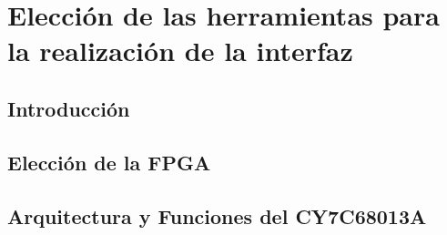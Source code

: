 \chapter{Elección de las herramientas para la realización de la interfaz}
	\section{Introducción}
		
	\section{Elección de la FPGA}
		

	
	\section{Arquitectura y Funciones del CY7C68013A}
			
		


	
%		
%		
%		
		